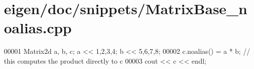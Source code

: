 \hypertarget{eigen_2doc_2snippets_2_matrix_base__noalias_8cpp_source}{}\section{eigen/doc/snippets/\+Matrix\+Base\+\_\+noalias.cpp}
\label{eigen_2doc_2snippets_2_matrix_base__noalias_8cpp_source}

\begin{DoxyCode}
00001 Matrix2d a, b, c; a << 1,2,3,4; b << 5,6,7,8;
00002 c.noalias() = a * b; \textcolor{comment}{// this computes the product directly to c}
00003 cout << c << endl;
\end{DoxyCode}
